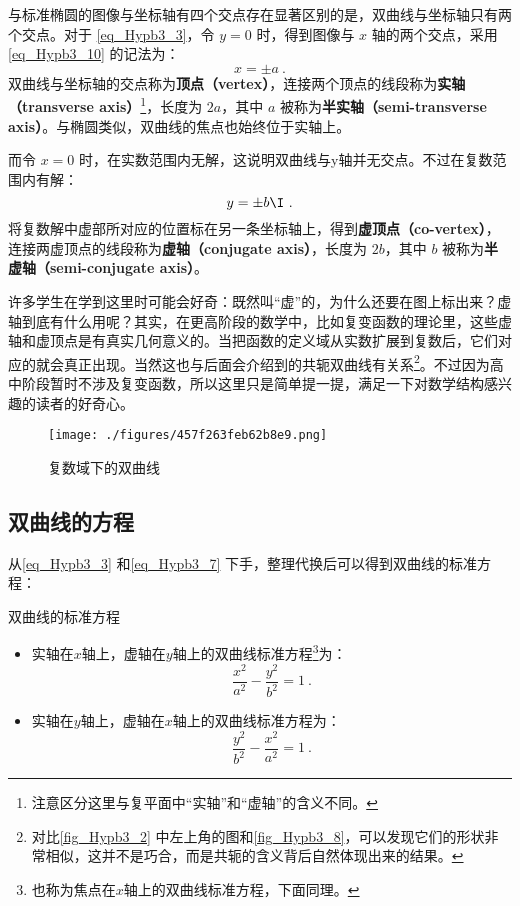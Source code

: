 与标准椭圆的图像与坐标轴有四个交点存在显著区别的是，双曲线与坐标轴只有两个交点。对于 \autoref{eq_Hypb3_3}，令 $y=0$ 时，得到图像与 $x$ 轴的两个交点，采用\autoref{eq_Hypb3_10} 的记法为：
\begin{equation}
x = \pm a~.
\end{equation}
双曲线与坐标轴的交点称为\textbf{顶点（vertex）}，连接两个顶点的线段称为\textbf{实轴（transverse axis）}\footnote{注意区分这里与复平面中“实轴”和“虚轴”的含义不同。}，长度为 $2a$，其中 $a$ 被称为\textbf{半实轴（semi-transverse axis）}。与椭圆类似，双曲线的焦点也始终位于实轴上。

而令 $x=0$ 时，在实数范围内无解，这说明双曲线与y轴并无交点。不过在复数范围内有解：
\begin{equation}
y = \pm  b\I~.
\end{equation}
将复数解中虚部所对应的位置标在另一条坐标轴上，得到\textbf{虚顶点（co-vertex）}，连接两虚顶点的线段称为\textbf{虚轴（conjugate axis）}，长度为 $2b$，其中 $b$ 被称为\textbf{半虚轴（semi-conjugate axis）}。

许多学生在学到这里时可能会好奇：既然叫“虚”的，为什么还要在图上标出来？虚轴到底有什么用呢？其实，在更高阶段的数学中，比如复变函数的理论里，这些虚轴和虚顶点是有真实几何意义的。当把函数的定义域从实数扩展到复数后，它们对应的就会真正出现。当然这也与后面会介绍到的共轭双曲线有关系\footnote{对比\autoref{fig_Hypb3_2} 中左上角的图和\autoref{fig_Hypb3_8}，可以发现它们的形状非常相似，这并不是巧合，而是共轭的含义背后自然体现出来的结果。}。不过因为高中阶段暂时不涉及复变函数，所以这里只是简单提一提，满足一下对数学结构感兴趣的读者的好奇心。

\begin{figure}[ht]
\centering
\texttt{[image: ./figures/457f263feb62b8e9.png]}
\caption{复数域下的双曲线} \label{fig_Hypb3_2}
\end{figure}

\subsection{双曲线的方程}

从\autoref{eq_Hypb3_3} 和\autoref{eq_Hypb3_7} 下手，整理代换后可以得到双曲线的标准方程：

\begin{theorem}{双曲线的标准方程}
\begin{itemize}
\item 实轴在$x$轴上，虚轴在$y$轴上的双曲线标准方程\footnote{也称为焦点在$x$轴上的双曲线标准方程，下面同理。}为：
\begin{equation}\label{eq_Hypb3_4}
\frac{x^2}{a^2} - \frac{y^2}{b^2} = 1~.
\end{equation}
\item 实轴在$y$轴上，虚轴在$x$轴上的双曲线标准方程为：
\begin{equation}
\frac{y^2}{b^2} -\frac{x^2}{a^2}  = 1~.
\end{equation}
\end{itemize}
\end{theorem}

